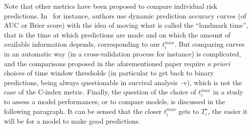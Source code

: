 \documentclass[11pt]{article}
\begin{document}
Note that other metrics have been proposed to compare individual risk predictions. In~\citet{blanche2015quantifying} for instance, authors use dynamic prediction accuracy curves (of AUC or Brier score) with the idea of moving what is called the ``landmark time'', that is the time at which predictions are made and on which the amount of available information depends, corresponding to our $t^{max}_i$. But comparing curves in an automatic way (in a cross-validation process for instance) is complicated, and the comparisons proposed in the aforementioned paper require \textit{a priori} choices of time window thresholds (in particular to get back to binary predictions, being always questionable in survival analysis~-v\citep{bussy2019comparison}), which is not the case of the C-index metric.
Finally, the question of the choice of $t^{max}_i$ in a study to assess a model performances, or to compare models, is discussed in the following paragraph. It can be sensed that the closer $t^{max}_i$ gets to $T^\star_i$, the easier it will be for a model to make good predictions.
\end{document}
